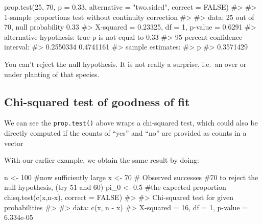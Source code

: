 \documentclass[
  letterpaper,
  DIV=11,
  numbers=noendperiod]{scrreprt}
\newenvironment{Shaded}{\begin{snugshade}}{\end{snugshade}}
\newcommand{\AttributeTok}[1]{\textcolor[rgb]{0.40,0.45,0.13}{#1}}
\newcommand{\CommentTok}[1]{\textcolor[rgb]{0.37,0.37,0.37}{#1}}
\newcommand{\ConstantTok}[1]{\textcolor[rgb]{0.56,0.35,0.01}{#1}}
\newcommand{\DecValTok}[1]{\textcolor[rgb]{0.68,0.00,0.00}{#1}}
\newcommand{\FloatTok}[1]{\textcolor[rgb]{0.68,0.00,0.00}{#1}}
\newcommand{\FunctionTok}[1]{\textcolor[rgb]{0.28,0.35,0.67}{#1}}
\newcommand{\NormalTok}[1]{\textcolor[rgb]{0.00,0.23,0.31}{#1}}
\newcommand{\OtherTok}[1]{\textcolor[rgb]{0.00,0.23,0.31}{#1}}
\newcommand{\SpecialCharTok}[1]{\textcolor[rgb]{0.37,0.37,0.37}{#1}}
\newcommand{\StringTok}[1]{\textcolor[rgb]{0.13,0.47,0.30}{#1}}
\begin{document}
\begin{Shaded}
\begin{Highlighting}[]
\FunctionTok{prop.test}\NormalTok{(}\DecValTok{25}\NormalTok{, }\DecValTok{70}\NormalTok{, }\AttributeTok{p =} \FloatTok{0.33}\NormalTok{, }\AttributeTok{alternative =} \StringTok{"two.sided"}\NormalTok{, }\AttributeTok{correct =} \ConstantTok{FALSE}\NormalTok{)}
\CommentTok{\#\textgreater{} }
\CommentTok{\#\textgreater{}  1{-}sample proportions test without continuity correction}
\CommentTok{\#\textgreater{} }
\CommentTok{\#\textgreater{} data:  25 out of 70, null probability 0.33}
\CommentTok{\#\textgreater{} X{-}squared = 0.23325, df = 1, p{-}value = 0.6291}
\CommentTok{\#\textgreater{} alternative hypothesis: true p is not equal to 0.33}
\CommentTok{\#\textgreater{} 95 percent confidence interval:}
\CommentTok{\#\textgreater{}  0.2550334 0.4741161}
\CommentTok{\#\textgreater{} sample estimates:}
\CommentTok{\#\textgreater{}         p }
\CommentTok{\#\textgreater{} 0.3571429}
\end{Highlighting}
\end{Shaded}

You can't reject the null hypothesis. It is not really a surprise,
i.e.~an over or under planting of that species.

\subsection{Chi-squared test of goodness of
fit}\label{chi-squared-test-of-goodness-of-fit}

We can see the \texttt{prop.test()} above wraps a chi-squared test,
which could also be directly computed if the counts of ``yes'' and
``no'' are provided as counts in a vector

With our earlier example, we obtain the same result by doing:

\begin{Shaded}
\begin{Highlighting}[]
\NormalTok{n }\OtherTok{\textless{}{-}} \DecValTok{100} \CommentTok{\#now sufficiently large}
\NormalTok{x }\OtherTok{\textless{}{-}} \DecValTok{70} \CommentTok{\# Observed successes \#70 to reject the null hypothesis, (try 51 and 60)}
\NormalTok{pi\_0 }\OtherTok{\textless{}{-}} \FloatTok{0.5} \CommentTok{\#the expected proportion}
\FunctionTok{chisq.test}\NormalTok{(}\FunctionTok{c}\NormalTok{(x,n}\SpecialCharTok{{-}}\NormalTok{x), }\AttributeTok{correct =} \ConstantTok{FALSE}\NormalTok{) }
\CommentTok{\#\textgreater{} }
\CommentTok{\#\textgreater{}  Chi{-}squared test for given probabilities}
\CommentTok{\#\textgreater{} }
\CommentTok{\#\textgreater{} data:  c(x, n {-} x)}
\CommentTok{\#\textgreater{} X{-}squared = 16, df = 1, p{-}value = 6.334e{-}05}
\end{Highlighting}
\end{Shaded}
\end{document}
